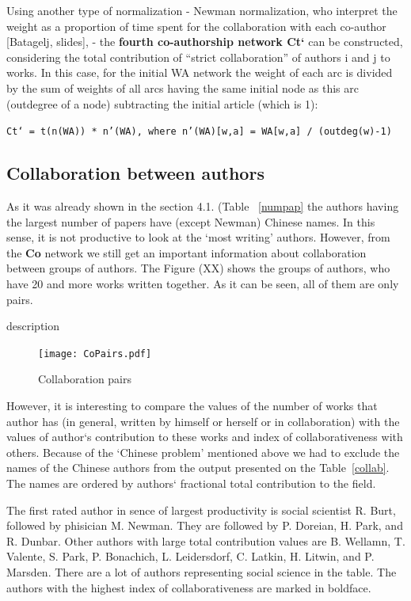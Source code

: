 \documentclass[11pt]{article} %
\begin{document}
Using another type of normalization - Newman normalization, who interpret the weight as a proportion of time spent for the collaboration with each co-author [Batagelj, slides], - the \textbf{fourth co-authorship network Ct`} can be constructed, considering the total contribution of “strict collaboration” of authors i and j to works. In this case, for the initial WA network the weight of each arc is divided by the sum of weights of all arcs having the same initial node as this arc (outdegree of a node) subtracting the initial article (which is 1): \medskip 

\texttt{Ct` = t(n(WA)) * n’(WA), where n’(WA)[w,a] = WA[w,a] / (outdeg(w)-1)} 

\subsection{Collaboration between authors}  

As it was already shown in the section 4.1. (Table~ \ref{numpap} the authors having the largest number of papers have (except Newman) Chinese names. In this sense, it is not productive to look at the `most writing' authors. However, from the \textbf{Co} network we still get an important information about collaboration between groups of authors. The Figure (XX) shows the groups of authors, who have 20 and more works written together. As it can be seen, all of them are only pairs. \medskip  


description
\begin{figure}
\begin{center}
\texttt{[image: CoPairs.pdf]}
\end{center}
\caption{Collaboration pairs} \label{coPairs}
\end{figure}


However, it is interesting to compare the values of the number of works that author has (in general, written by himself or herself or in collaboration) with the values of author`s contribution to these works and index of collaborativeness with others. Because of the `Chinese problem'  mentioned above we had to exclude the names of the Chinese authors from the output presented on the Table~\ref{collab}.  The names are ordered by authors` fractional total contribution to the field.\medskip  
 
The first rated author in sence of largest productivity is social scientist R. Burt, followed by phisician M. Newman. They are followed by P. Doreian, H. Park, and R. Dunbar. Other authors with large total contribution values are B. Wellamn, T. Valente, S. Park, P. Bonachich, L. Leidersdorf, C. Latkin, H. Litwin, and P. Marsden. There are a lot of authors representing social science in the table. The authors with the highest index of collaborativeness are marked in boldface. \medskip 
\end{document}
